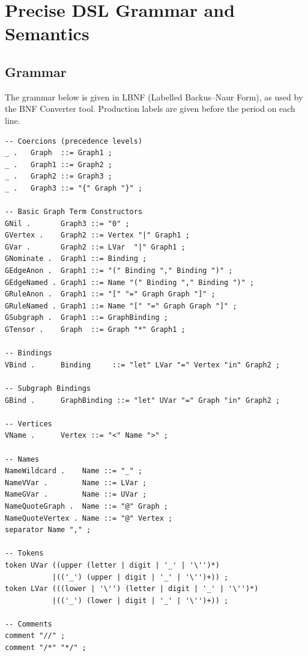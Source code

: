 \documentclass[11pt, a4paper]{article}
\theoremstyle{definition}
\theoremstyle{plain}
\theoremstyle{remark}
\begin{document}
\appendix
\appendixpage
\addappheadtotoc

\section{Precise DSL Grammar and Semantics}
\label{app:dsl}

\subsection{Grammar}

The grammar below is given in LBNF (Labelled Backus--Naur Form), as used by the
BNF Converter tool.  Production labels are given before the period on each
line.

\begin{lstlisting}[style=bnf, caption={Complete LBNF grammar of the graph DSL}]
-- Coercions (precedence levels)
_ .   Graph  ::= Graph1 ;
_ .   Graph1 ::= Graph2 ;
_ .   Graph2 ::= Graph3 ;
_ .   Graph3 ::= "{" Graph "}" ;

-- Basic Graph Term Constructors
GNil .       Graph3 ::= "0" ;
GVertex .    Graph2 ::= Vertex "|" Graph1 ;
GVar .       Graph2 ::= LVar  "|" Graph1 ;
GNominate .  Graph1 ::= Binding ;
GEdgeAnon .  Graph1 ::= "(" Binding "," Binding ")" ;
GEdgeNamed . Graph1 ::= Name "(" Binding "," Binding ")" ;
GRuleAnon .  Graph1 ::= "[" "=" Graph Graph "]" ;
GRuleNamed . Graph1 ::= Name "[" "=" Graph Graph "]" ;
GSubgraph .  Graph1 ::= GraphBinding ;
GTensor .    Graph  ::= Graph "*" Graph1 ;

-- Bindings
VBind .      Binding     ::= "let" LVar "=" Vertex "in" Graph2 ;

-- Subgraph Bindings
GBind .      GraphBinding ::= "let" UVar "=" Graph "in" Graph2 ;

-- Vertices
VName .      Vertex ::= "<" Name ">" ;

-- Names
NameWildcard .    Name ::= "_" ;
NameVVar .        Name ::= LVar ;
NameGVar .        Name ::= UVar ;
NameQuoteGraph .  Name ::= "@" Graph ;
NameQuoteVertex . Name ::= "@" Vertex ;
separator Name "," ;

-- Tokens
token UVar ((upper (letter | digit | '_' | '\'')*)
           |(('_') (upper | digit | '_' | '\'')+)) ;
token LVar (((lower | '\'') (letter | digit | '_' | '\'')*)
           |(('_') (lower | digit | '_' | '\'')+)) ;

-- Comments
comment "//" ;
comment "/*" "*/" ;
\end{lstlisting}
\end{document}
